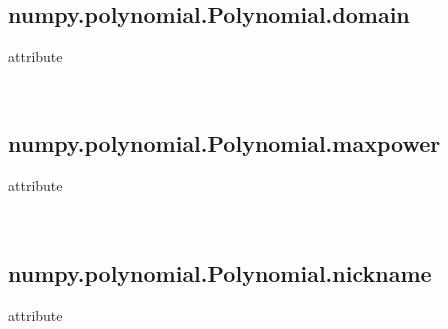 \documentclass[letterpaper,10pt,english]{sphinxmanual}
\begin{document}
\begin{fulllineitems}
\begin{savenotes}
\begin{longtable}[c]{}
\\
\hline
\end{longtable}\sphinxatlongtableend\end{savenotes}


\subsection{numpy.polynomial.Polynomial.domain}
\label{\detokenize{generated/generated/numpy.polynomial.Polynomial.domain:numpy-polynomial-polynomial-domain}}\label{\detokenize{generated/generated/numpy.polynomial.Polynomial.domain::doc}}
attribute

\begin{fulllineitems}
\label{\detokenize{generated/generated/numpy.polynomial.Polynomial.domain:numpy.polynomial.Polynomial.domain}}~
\end{fulllineitems}



\subsection{numpy.polynomial.Polynomial.maxpower}
\label{\detokenize{generated/generated/numpy.polynomial.Polynomial.maxpower:numpy-polynomial-polynomial-maxpower}}\label{\detokenize{generated/generated/numpy.polynomial.Polynomial.maxpower::doc}}
attribute

\begin{fulllineitems}
\label{\detokenize{generated/generated/numpy.polynomial.Polynomial.maxpower:numpy.polynomial.Polynomial.maxpower}}~
\end{fulllineitems}



\subsection{numpy.polynomial.Polynomial.nickname}
\label{\detokenize{generated/generated/numpy.polynomial.Polynomial.nickname:numpy-polynomial-polynomial-nickname}}\label{\detokenize{generated/generated/numpy.polynomial.Polynomial.nickname::doc}}
attribute


\end{fulllineitems}
\end{document}
